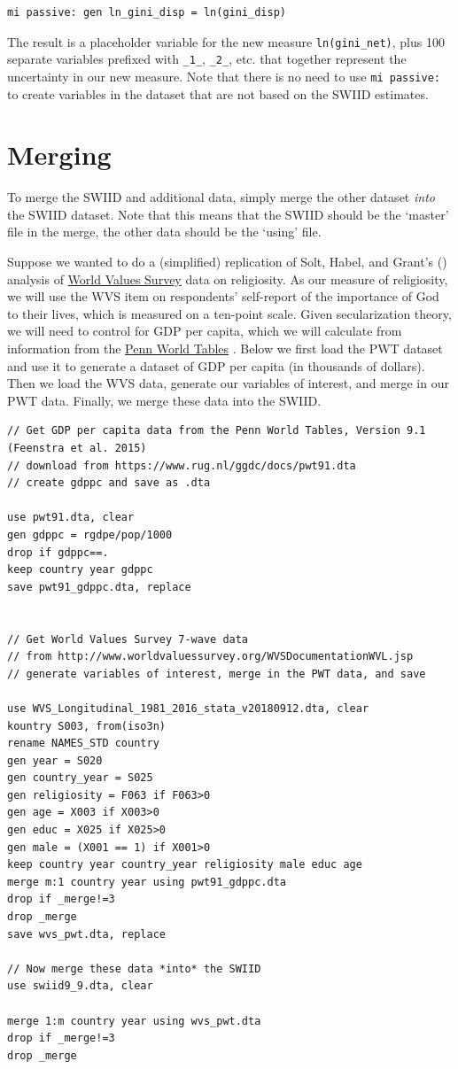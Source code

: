 \documentclass[11pt]{article}
\begin{document}
\begin{verbatim}
mi passive: gen ln_gini_disp = ln(gini_disp)
\end{verbatim}

The result is a placeholder variable for the new measure \verb+ln(gini_net)+, plus 100 separate variables prefixed with \verb+_1_+, \verb+_2_+, etc. that together represent the uncertainty in our new measure.  Note that there is no need to use \verb+mi passive:+ to create variables in the dataset that are not based on the SWIID estimates.

\section{Merging}
To merge the SWIID and additional data, simply merge the other dataset \emph{into} the SWIID dataset.  Note that this means that the SWIID should be the `master' file in the merge, the other data should be the `using' file. 

Suppose we wanted to do a (simplified) replication of Solt, Habel, and Grant's (\citeyear{Solt2011a}) analysis of \href{http://worldvaluessurvey.org}{World Values Survey} data on religiosity.  As our measure of religiosity, we will use the WVS item on respondents' self-report of the importance of God to their lives, which is measured on a ten-point scale.  Given secularization theory, we will need to control for GDP per capita, which we will calculate from information from the \href{www.ggdc.net/pwt}{Penn World Tables} \citep{Feenstra2015}.  Below we first load the PWT dataset and use it to generate a dataset of GDP per capita (in thousands of dollars).  Then we load the WVS data, generate our variables of interest, and merge in our PWT data.  Finally, we merge these data into the SWIID.

\begin{verbatim}
// Get GDP per capita data from the Penn World Tables, Version 9.1 (Feenstra et al. 2015)
// download from https://www.rug.nl/ggdc/docs/pwt91.dta
// create gdppc and save as .dta

use pwt91.dta, clear
gen gdppc = rgdpe/pop/1000
drop if gdppc==.
keep country year gdppc
save pwt91_gdppc.dta, replace


// Get World Values Survey 7-wave data 
// from http://www.worldvaluessurvey.org/WVSDocumentationWVL.jsp
// generate variables of interest, merge in the PWT data, and save

use WVS_Longitudinal_1981_2016_stata_v20180912.dta, clear
kountry S003, from(iso3n)
rename NAMES_STD country
gen year = S020
gen country_year = S025 
gen religiosity = F063 if F063>0
gen age = X003 if X003>0
gen educ = X025 if X025>0
gen male = (X001 == 1) if X001>0
keep country year country_year religiosity male educ age
merge m:1 country year using pwt91_gdppc.dta
drop if _merge!=3
drop _merge
save wvs_pwt.dta, replace

// Now merge these data *into* the SWIID
use swiid9_9.dta, clear

merge 1:m country year using wvs_pwt.dta
drop if _merge!=3
drop _merge

\end{verbatim}
\end{document}
